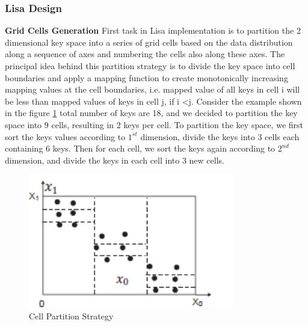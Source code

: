 \subsubsection{Lisa Design}
\textbf{Grid Cells Generation} 
First task in Lisa implementation is to partition the 2 dimensional key space into a series of grid cells based on the data distribution
along a sequence of axes and numbering the cells also along
these axes. The principal idea behind this partition strategy is to divide the key space into cell boundaries and apply a mapping function to create monotonically increasing mapping values at the cell boundaries, i.e. mapped value of all keys in cell i will be less than mapped values of keys in cell j, if i <j. Consider the example shown in the figure \ref{fig:Cell_Parttion} total number of keys are 18, and we decided to partition the key space into 9 cells, resulting in 2 keys per cell. To partition the key space, we first sort the keys values according to $1^{st}$  dimension, divide the keys into 3 cells each containing 6 keys. Then for each cell, we sort the keys again according to $2^{nd}$  dimension, and divide the keys in each cell into 3 new cells. 


\begin{figure}[t]
    \centering
    \includegraphics[width=0.8\textwidth]{graphs/Cell_partition.png}
    \caption{Cell Partition Strategy }
    \label{fig:Cell_Parttion}
\end{figure}


